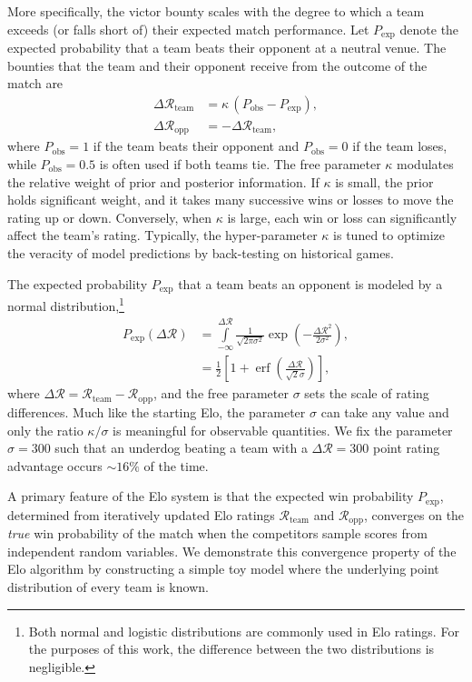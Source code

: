 \documentclass[aps,prc,reprint,amsmath,superscriptaddress,nofootinbib]{revtex4-1}
\newcommand{\R}{\mathcal{R}}
\DeclareMathOperator\erf{erf}
\begin{document}
More specifically, the victor bounty scales with the degree to which a team exceeds (or falls short of) their expected match performance.
Let $P_\text{exp}$ denote the expected probability that a team beats their opponent at a neutral venue.
The bounties that the team and their opponent receive from the outcome of the match are
\begin{align}
  \label{elo}
  \Delta \R_\text{team} &= \kappa \,(P_\text{obs} - P_\text{exp}),\\
  \Delta \R_\text{opp} &= -\Delta \R_\text{team},
\end{align}
where ${P_\text{obs}=1}$ if the team beats their opponent and ${P_\text{obs}=0}$ if the team loses, while $P_\text{obs}=0.5$ is often used if both teams tie.
The free parameter $\kappa$ modulates the relative weight of prior and posterior information. 
If $\kappa$ is small, the prior holds significant weight, and it takes many successive wins or losses to move the rating up or down.
Conversely, when $\kappa$ is large, each win or loss can significantly affect the team's rating.
Typically, the hyper-parameter $\kappa$ is tuned to optimize the veracity of model predictions by back-testing on historical games.

The expected probability $P_\text{exp}$ that a team beats an opponent is modeled by a normal distribution,\footnote{Both normal and logistic distributions are commonly used in Elo ratings. For the purposes of this work, the difference between the two distributions is negligible.}
\begin{align}
  \label{win_prob}
  P_\text{exp}(\Delta \R) &= \int\limits_{-\infty}^{\Delta \R} \frac{1}{\sqrt{2\pi \sigma^2}} \exp \left( -\frac{{\Delta\R}^2}{2 \sigma^2}\right),\\[1ex]
  &=\frac{1}{2}\left[1 + \erf \left( \frac{\Delta\R}{\sqrt{2} \sigma} \right) \right],
\end{align}
where $\Delta \R = \R_\text{team} - \R_\text{opp}$, and the free parameter $\sigma$ sets the scale of rating differences.
Much like the starting Elo, the parameter $\sigma$ can take any value and only the ratio $\kappa/\sigma$ is meaningful for observable quantities.
We fix the parameter $\sigma=300$ such that an underdog beating a team with a $\Delta\R=300$ point rating advantage occurs $\sim\!16\%$ of the time.

A primary feature of the Elo system is that the expected win probability $P_\text{exp}$, determined from iteratively updated Elo ratings $\R_\text{team}$ and $\R_\text{opp}$, converges on the \emph{true} win probability of the match when the competitors sample scores from independent random variables.
We demonstrate this convergence property of the Elo algorithm by constructing a simple toy model where the underlying point distribution of every team is known.
\end{document}
